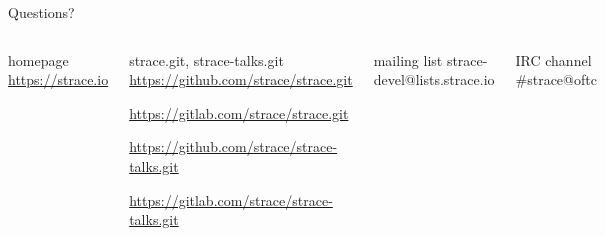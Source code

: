 \documentclass[unicode,aspectratio=169,xcolor={table,dvipsnames,usernames}]{beamer}
\begin{document}
{
\begin{frame}[noframenumbering]{Questions?}
	\begin{columns}
		\column{9cm}
\begin{block}{\large homepage}
	\url{https://strace.io}
\end{block}
\begin{block}{\large strace.git, strace-talks.git}
	\url{https://github.com/strace/strace.git}

	\url{https://gitlab.com/strace/strace.git}

\smallskip

	\url{https://github.com/strace/strace-talks.git}

	\url{https://gitlab.com/strace/strace-talks.git}
\end{block}
\begin{block}{\large mailing list}
	strace-devel@lists.strace.io
\end{block}
\begin{block}{\large IRC channel}
	\#strace@oftc
\end{block}
		\column{3cm}
			\centerline{}
	\end{columns}
\end{frame}
}
\end{document}
